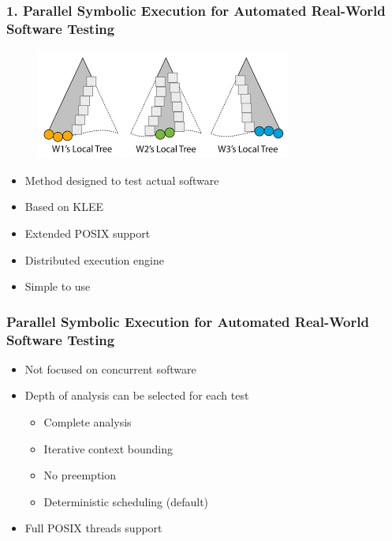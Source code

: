 \documentclass{beamer}
\begin{document}
	
	
	\begin{frame}
		\frametitle{1. Parallel Symbolic Execution for Automated Real-World Software Testing \cite{base3}}
		
		\begin{figure}[htbp]
			\centering
			\includegraphics[scale=0.5]{cloud9}
		\end{figure}
		
		\begin{itemize}
			\item Method designed to test actual software
			\item Based on KLEE
			\item Extended POSIX support
			\item Distributed execution engine
			\item Simple to use
		\end{itemize}
	\end{frame}
	
	\begin{frame}
		\frametitle{Parallel Symbolic Execution for Automated Real-World Software Testing \cite{base3}}
		
		\begin{itemize}
			\item Not focused on concurrent software
			\item Depth of analysis can be selected for each test
			\begin{itemize}
				\item Complete analysis
				\item Iterative context bounding
				\item No preemption
				\item Deterministic scheduling (default)
			\end{itemize}
			\item Full POSIX threads support
		\end{itemize}
	\end{frame}
	
\end{document}
